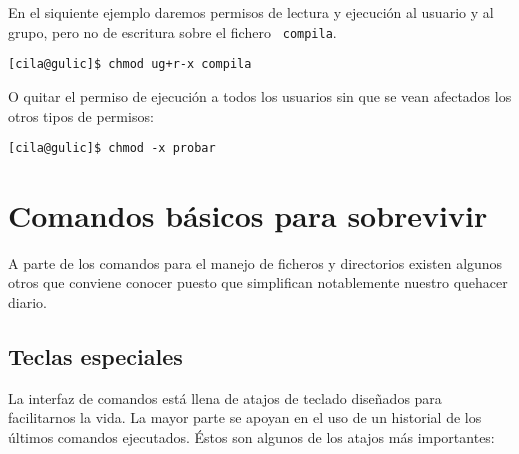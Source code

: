 En el  siquiente ejemplo  daremos permisos de  lectura y  ejecución al
usuario  y al  grupo,  pero  no de  escritura  sobre  el fichero  {\tt
compila}.

\begin{verbatim}
[cila@gulic]$ chmod ug+r-x compila
\end{verbatim}

O quitar el permiso de ejecución a  todos los usuarios sin que se vean
afectados los otros tipos de permisos:

\begin{verbatim}
[cila@gulic]$ chmod -x probar
\end{verbatim}

\section{Comandos básicos para sobrevivir}

A  parte de  los comandos  para el  manejo de  ficheros y  directorios
existen  algunos otros  que  conviene conocer  puesto que  simplifican
notablemente nuestro quehacer diario.

\subsection{Teclas especiales}

La interfaz de comandos está llena de atajos de teclado diseñados para
facilitarnos  la vida.  La  mayor parte  se  apoyan en  el  uso de  un
historial de los últimos comandos ejecutados. Éstos son algunos de los
atajos más importantes:

